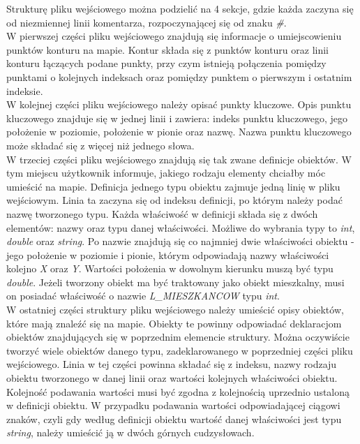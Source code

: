 \documentclass[a4paper,12pt]{article}
\newcommand\tab[1][0.6cm]{\hspace*{#1} }
\begin{document}
Strukturę pliku wejściowego można podzielić na 4 sekcje, gdzie każda zaczyna się od niezmiennej linii komentarza, rozpoczynającej się od znaku \textit{\#}.
\\\tab W pierwszej części pliku wejściowego znajdują się informacje o umiejscowieniu punktów konturu na mapie. Kontur składa się z punktów konturu oraz linii konturu łączących podane punkty, przy czym istnieją połączenia pomiędzy punktami o kolejnych indeksach oraz pomiędzy punktem o pierwszym i ostatnim indeksie.
\\\tab W kolejnej części pliku wejściowego należy opisać punkty kluczowe. Opis punktu kluczowego znajduje się w jednej linii i zawiera: indeks punktu kluczowego, jego położenie w poziomie, położenie w pionie oraz nazwę. Nazwa punktu kluczowego może składać się z więcej niż jednego słowa.
\\\tab W trzeciej części pliku wejściowego znajdują się tak zwane definicje obiektów. W tym miejscu użytkownik informuje, jakiego rodzaju elementy chciałby móc umieścić na mapie. Definicja jednego typu obiektu zajmuje jedną linię w pliku wejściowym. Linia ta zaczyna się od indeksu definicji, po którym należy podać nazwę tworzonego typu. Każda właściwość w definicji składa się z dwóch elementów: nazwy oraz typu danej właściwości. Możliwe do wybrania typy to \textit{int}, \textit{double} oraz \textit{string}. Po nazwie znajdują się co najmniej dwie właściwości obiektu - jego położenie w poziomie i pionie, którym odpowiadają nazwy właściwości kolejno \textit{X} oraz \textit{Y}. Wartości położenia w dowolnym kierunku muszą być typu \textit{double}. Jeżeli tworzony obiekt ma być traktowany jako obiekt mieszkalny, musi on posiadać właściwość o nazwie \textit{L\_MIESZKANCOW} typu \textit{int}.
\\\tab W ostatniej części struktury pliku wejściowego należy umieścić opisy obiektów, które mają znaleźć się na mapie. Obiekty te powinny odpowiadać deklaracjom obiektów znajdujących się w poprzednim elemencie struktury. Można oczywiście tworzyć wiele obiektów danego typu, zadeklarowanego w poprzedniej części pliku wejściowego. Linia w tej części powinna składać się z indeksu, nazwy rodzaju obiektu tworzonego w danej linii oraz wartości kolejnych właściwości obiektu. Kolejność podawania wartości musi być zgodna z kolejnością uprzednio ustaloną w definicji obiektu. W przypadku podawania wartości odpowiadającej ciągowi znaków, czyli gdy według definicji obiektu wartość danej właściwości jest typu \textit{string}, należy umieścić ją w dwóch górnych cudzysłowach.
\end{document}
